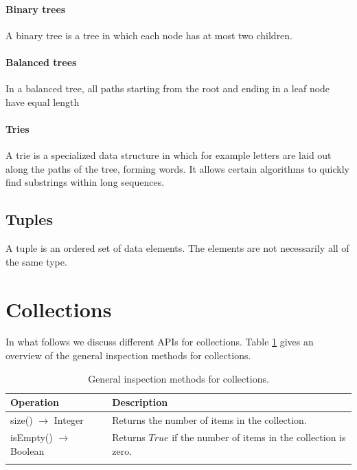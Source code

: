 \paragraph{Binary trees}

A binary tree is a tree in which each node has at most two children.


\paragraph{Balanced trees}

In a balanced tree, all paths starting from the root and ending in a leaf node have equal length


\paragraph{Tries}

A trie is a specialized data structure in which for example letters are laid out along the paths of the tree, forming words. It allows certain algorithms to quickly find substrings within long sequences.


\subsection{Tuples}

A tuple is an ordered set of data elements. The elements are not necessarily all of the same type.



\section{Collections}

In what follows we discuss different APIs for collections. Table \ref{tab:api:collections} gives an overview of the general inspection methods for collections.

\begin{table}[H]
	\caption{General inspection methods for collections.}
	\label{tab:api:collections}
	\begin{tabular}{p{150px} | p{250px}}
		\textbf{Operation} & \textbf{Description} \\
		\hline
		size() $\rightarrow$ Integer & Returns the number of items in the collection. \\
		isEmpty() $\rightarrow$ Boolean & Returns $True$ if the number of items in the collection is zero. \\
		& \\
		\hline
	\end{tabular}
\end{table}



